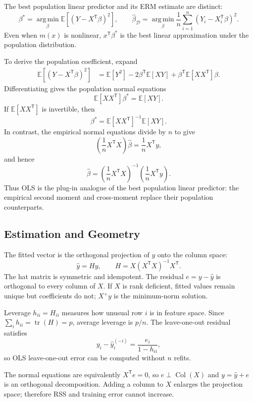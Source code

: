 \documentclass[12pt,oneside]{book}
\numberwithin{equation}{section}
\theoremstyle{definition}
\theoremstyle{plain}
\theoremstyle{remark}
\newcommand{\E}{\mathbb{E}}
\newcommand{\argmin}{\operatorname*{arg\,min}}
\newcommand{\tr}{\operatorname{tr}}
\begin{document}
The best population linear predictor and its ERM estimate are distinct:
\[
 \beta^*=\argmin_\beta\E[(Y-X^\mathsf T\beta)^2],
 \qquad
 \widehat\beta_{\mathcal D}
 =\argmin_\beta\frac1n\sum_{i=1}^n
 (Y_i-X_i^\mathsf T\beta)^2.
\]
Even when $m(x)$ is nonlinear, $x^\mathsf T\beta^*$ is the best linear
approximation under the population distribution.

To derive the population coefficient, expand
\begin{align*}
 \E[(Y-X^\mathsf T\beta)^2]
 &=\E[Y^2]-2\beta^\mathsf T\E[XY]
   +\beta^\mathsf T\E[XX^\mathsf T]\beta.
\end{align*}
Differentiating gives the population normal equations
\[
 \E[XX^\mathsf T]\beta^*=\E[XY].
\]
If $\E[XX^\mathsf T]$ is invertible, then
\begin{equation}
 \beta^*=\E[XX^\mathsf T]^{-1}\E[XY].
 \label{eq:population-linear-projection}
\end{equation}
In contrast, the empirical normal equations divide by $n$ to give
\[
 \left(\frac1nX^\mathsf TX\right)\widehat\beta
 =\frac1nX^\mathsf Ty,
\]
and hence
\[
 \widehat\beta
 =\left(\frac1nX^\mathsf TX\right)^{-1}
   \left(\frac1nX^\mathsf Ty\right).
\]
Thus OLS is the plug-in analogue of the best population linear predictor:
the empirical second moment and cross-moment replace their population
counterparts.

\subsection{Estimation and Geometry}

The fitted vector is the orthogonal projection of $y$ onto the column space:
\[
 \widehat y=Hy,\qquad
 H=X(X^\mathsf TX)^{-1}X^\mathsf T.
\]
The hat matrix is symmetric and idempotent. The residual $e=y-\widehat y$ is
orthogonal to every column of $X$. If $X$ is rank deficient, fitted values
remain unique but coefficients do not; $X^+y$ is the minimum-norm solution.

Leverage $h_{ii}=H_{ii}$ measures how unusual row $i$ is in feature space.
Since $\sum_i h_{ii}=\tr(H)=p$, average leverage is $p/n$. The leave-one-out
residual satisfies
\begin{equation}
    y_i-\widehat y_i^{(-i)}=\frac{e_i}{1-h_{ii}},
    \label{eq:loo-ols}
\end{equation}
so OLS leave-one-out error can be computed without $n$ refits.

The normal equations are equivalently $X^\mathsf Te=0$, so
$e\perp\operatorname{Col}(X)$ and $y=\widehat y+e$ is an orthogonal
decomposition. Adding a column to $X$ enlarges the projection space;
therefore RSS and training error cannot increase.
\end{document}
